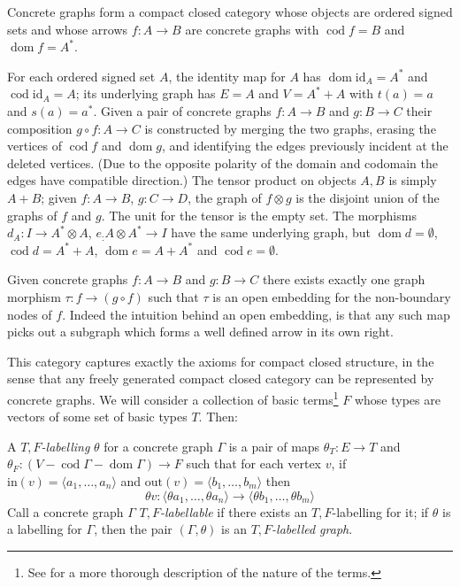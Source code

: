 \documentclass[runningheads]{llncs}
\newcommand{\dom}{\operatorname{dom}}
\newcommand{\cod}{\operatorname{cod}}
\newcommand{\id}[1]{\ensuremath{\mathrm{id}_{#1}}}
\begin{document}
\begin{proposition}
Concrete graphs form a compact closed category whose objects are
ordered signed sets and whose arrows $f:A\to B$ are concrete graphs with
$\cod f = B$  and $\dom f = A^*$.
\end{proposition}
For each ordered signed set $A$, the identity map for $A$ has
$\dom \id{A} = A^*$ and $\cod \id{A} = A$; its underlying
graph has $E = A$ and $V = A^* + A$ with $t(a) = a$ and $s(a) =
a^*$.  Given a pair of concrete graphs $f:A\to B$ and $g:B\to C$ their
composition $g\circ f:A\to C$ is constructed by merging the two
graphs, erasing the vertices of $\cod f$ and $\dom g$, and identifying
the edges previously incident at the deleted vertices.  (Due to the
opposite polarity of the domain and codomain the edges have compatible
direction.)  The tensor product on objects $A,B$ is simply $A+B$;
given $f:A\to B$, $g: C\to D$, the graph of $f \otimes g$ is the
disjoint union of the graphs of $f$ and $g$.  The unit for the tensor
is the empty set.  The morphisms $d_A : I \to A^* \otimes A$,
$e_: A \otimes A^* \to I$ have the same underlying graph, but $\dom d =
\emptyset$, $\cod d = A^*+A$, $\dom e = A+A^*$ and $\cod e = \emptyset$.

\begin{remark}
  Given concrete graphs $f : A\to B$ and $g:B\to C$ there exists
  exactly one graph morphism  $\tau:  f \to (g\circ f)$ such that
  $\tau$ is an open embedding for the non-boundary nodes
  of $f$.   Indeed the intuition behind an open embedding, is that any
  such map picks out a subgraph which forms a well defined arrow in
  its own right.
\end{remark}

This category captures exactly the axioms for compact closed
structure, in the sense that any freely generated compact closed
category can be represented by concrete graphs.  We will consider
a collection of basic terms\footnote{See \cite{Duncan:thesis:2006} for
  a more thorough description of the nature of the terms.} $F$
whose types are vectors of some set of basic types $T$.  Then:

\begin{definition}
  A \emph{$T,F$-labelling} $\theta$ for a concrete graph $\Gamma$ is a pair of
  maps  $\theta_T : E \to T$ and $\theta_F : (V - \cod\Gamma -
  \dom\Gamma) \to F$  such that for each vertex  $v$, if
  $\text{in}(v) = \langle a_1, \ldots, a_n\rangle$ and $\text{out}(v)
  = \langle b_1, \ldots, b_m\rangle$ then 
  \[
  \theta v : \langle \theta a_1, \ldots, \theta a_n \rangle
  \to 
  \langle \theta b_1, \ldots, \theta b_m \rangle
  \]
  Call a concrete graph $\Gamma$ \emph{$T,F$-labellable} if there exists an 
  $T,F$-labelling for it; if $\theta$ is a labelling for $\Gamma$, then
 the pair $(\Gamma,\theta)$ is an \emph{$T,F$-labelled graph}.
\end{definition}
\end{document}

